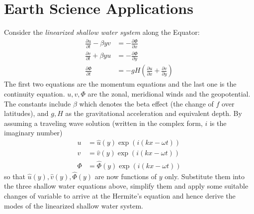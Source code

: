 \section{Earth Science Applications}

\begin{exmp}
Consider the \textit{linearized shallow water system} along the Equator:
\begin{align*}
\frac{\partial u}{\partial t} - \beta y v &= -\frac{\partial \Phi}{\partial x} \\
\frac{\partial v}{\partial t} + \beta y u &= -\frac{\partial \Phi}{\partial y} \\
\frac{\partial \Phi}{\partial t} &= - gH(\frac{\partial u}{\partial x} + \frac{\partial v}{\partial y})
\end{align*}
The first two equations are the momentum equations and the last one is the continuity equation. $u, v, \Phi$ are the zonal, meridional winds and the geopotential. The constants include $\beta$ which denotes the beta effect (the change of $f$ over latitudes), and $g, H$ as the gravitational acceleration and equivalent depth. By assuming a traveling wave solution (written in the complex form, $i$ is the imaginary number)
\begin{align*}
u &= \hat{u}(y)\exp(i(kx-\omega t)) \\
v &= \hat{v}(y)\exp(i(kx-\omega t)) \\
\Phi &= \hat{\Phi}(y)\exp(i(kx-\omega t))
\end{align*}
so that $\hat{u}(y), \hat{v}(y), \hat{\Phi}(y)$ are now functions of $y$ only. Substitute them into the three shallow water equations above, simplify them and apply some suitable changes of variable to arrive at the Hermite's equation and hence derive the modes of the linearized shallow water system.
\end{exmp}

